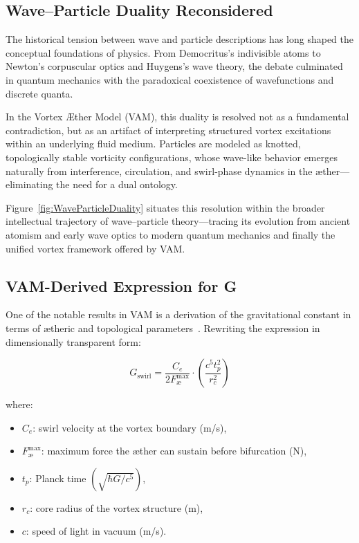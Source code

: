\subsection*{Wave–Particle Duality Reconsidered}

The historical tension between wave and particle descriptions has long shaped the conceptual foundations of physics. From Democritus’s indivisible atoms to Newton’s corpuscular optics and Huygens’s wave theory, the debate culminated in quantum mechanics with the paradoxical coexistence of wavefunctions and discrete quanta.

In the Vortex Æther Model (VAM), this duality is resolved not as a fundamental contradiction, but as an artifact of interpreting structured vortex excitations within an underlying fluid medium. Particles are modeled as knotted, topologically stable vorticity configurations, whose wave-like behavior emerges naturally from interference, circulation, and swirl-phase dynamics in the æther—eliminating the need for a dual ontology.

Figure~\ref{fig:WaveParticleDuality} situates this resolution within the broader intellectual trajectory of wave–particle theory—tracing its evolution from ancient atomism and early wave optics to modern quantum mechanics and finally the unified vortex framework offered by VAM.





\subsection*[VAM-Derived Expression for G]{VAM-Derived Expression for G}

One of the notable results in VAM is a derivation of the gravitational constant in terms of ætheric and topological parameters~\cite{VAM-2, VAM-13, VAM-14}. Rewriting the expression in dimensionally transparent form:

\begin{equation}
    G_\text{swirl} = \frac{C_e}{2 F^{\max}_{\text{\ae}}} \cdot \left( \frac{c^5 t_p^2}{r_c^2} \right)
\end{equation}

\noindent where:
\begin{itemize}
    \item $C_e$: swirl velocity at the vortex boundary (m/s),
    \item $F^{\max}_{\text{\ae}}$: maximum force the æther can sustain before bifurcation (N),
    \item $t_p$: Planck time $ \left(\sqrt{\hbar G / c^5}\right) $,
    \item $r_c$: core radius of the vortex structure (m),
    \item $c$: speed of light in vacuum (m/s).
\end{itemize}

